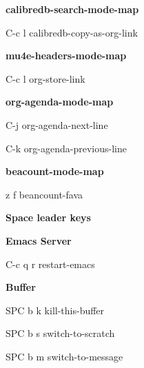 \documentclass[10pt]{article}
\renewcommand\section[1]{\bigskip\par\textbf{\color{heading}\large#1}\smallskip}
\renewcommand\subsection[1]{\smallskip\par\textbf{\color{heading}#1}}
\begin{document}
\begin{multicols}{4}
  \subsection{calibredb-search-mode-map}
  \begin{keylist}
    \item[C-c l] calibredb-copy-as-org-link
  \end{keylist}

  \subsection{mu4e-headers-mode-map}
  \begin{keylist}
    \item[C-c l] org-store-link
  \end{keylist}

  \subsection{org-agenda-mode-map}
  \begin{keylist}
    \item[C-j] org-agenda-next-line
    \item[C-k] org-agenda-previous-line
  \end{keylist}

  \subsection{beacount-mode-map}
  \begin{keylist}
    \item[z f] beancount-fava
  \end{keylist}


  \section{Space leader keys}
  \subsection{Emacs Server}
  \begin{keylist}
    \item[C-c q r] restart-emacs
    \end{keylist}

  \subsection{Buffer}
  \begin{keylist}
    \item[SPC b k] kill-this-buffer
    \item[SPC b s] switch-to-scratch
    \item[SPC b m] switch-to-message
  \end{keylist}


\end{multicols}
\end{document}
